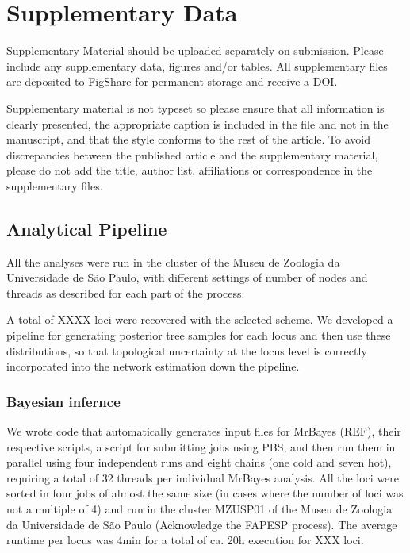 \documentclass[utf8]{frontiers_suppmat} %
\begin{document}
\onecolumn
{}

\title[Supplementary Material]{{}}


\maketitle


\section{Supplementary Data}

Supplementary Material should be uploaded separately on submission. Please include any supplementary data, figures and/or tables. All supplementary files are deposited to FigShare for permanent storage and receive a DOI.

Supplementary material is not typeset so please ensure that all information is clearly presented, the appropriate caption is included in the file and not in the manuscript, and that the style conforms to the rest of the article. To avoid discrepancies between the published article and the supplementary material, please do not add the title, author list, affiliations or correspondence in the supplementary files.

\subsection{Analytical Pipeline}

All the analyses were run in the cluster of the Museu de Zoologia da Universidade de S\~{a}o Paulo, with different settings of number of nodes and threads as described for each part of the process.

A total of XXXX loci were recovered with the selected scheme. We developed a pipeline for generating posterior tree samples for each locus and then use these distributions, so that topological uncertainty at the locus level is correctly incorporated into the network estimation down the pipeline.

\subsubsection{Bayesian infernce}

We wrote code that automatically generates input files for MrBayes (REF), their respective scripts, a script for submitting jobs using PBS, and then run them in parallel using four independent runs and eight chains (one cold and seven hot), requiring a total of 32 threads per individual MrBayes analysis. All the loci were sorted in four jobs of almost the same size (in cases where the number of loci was not a multiple of 4) and run in the cluster MZUSP01 of the Museu de Zoologia da Universidade de São Paulo (Acknowledge the FAPESP process). The average runtime per locus was 4min for a total of ca. 20h execution for XXX loci.
\end{document}
